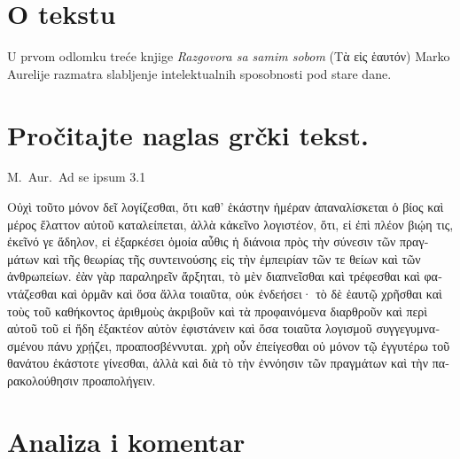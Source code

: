 \section*{O tekstu}

U prvom odlomku treće knjige \textit{Razgovora sa samim sobom} \textgreek[variant=ancient]{(Tὰ εἰς ἑαυτόν)} Marko Aurelije razmatra slabljenje intelektualnih sposobnosti pod stare dane.

\section*{Pročitajte naglas grčki tekst.}

M.~Aur.\ Ad se ipsum 3.1


\medskip


{\large

\begin{greek}

\noindent Οὐχὶ τοῦτο μόνον δεῖ λογίζεσθαι, ὅτι καθ' ἑκάστην ἡμέραν ἀπαναλίσκεται ὁ βίος καὶ μέρος ἔλαττον αὐτοῦ καταλείπεται, ἀλλὰ κἀκεῖνο λογιστέον, ὅτι, εἰ ἐπὶ πλέον βιῴη τις, ἐκεῖνό γε ἄδηλον, εἰ ἐξαρκέσει ὁμοία αὖθις ἡ διάνοια πρὸς τὴν σύνεσιν τῶν πραγμάτων καὶ τῆς θεωρίας τῆς συντεινούσης εἰς τὴν ἐμπειρίαν τῶν τε θείων καὶ τῶν ἀνθρωπείων. ἐὰν γὰρ παραληρεῖν ἄρξηται, τὸ μὲν διαπνεῖσθαι καὶ τρέφεσθαι καὶ φαντάζεσθαι καὶ ὁρμᾶν καὶ ὅσα ἄλλα τοιαῦτα, οὐκ ἐνδεήσει· τὸ δὲ ἑαυτῷ χρῆσθαι καὶ τοὺς τοῦ καθήκοντος ἀριθμοὺς ἀκριβοῦν καὶ τὰ προφαινόμενα διαρθροῦν καὶ περὶ αὐτοῦ τοῦ εἰ ἤδη ἐξακτέον αὑτὸν ἐφιστάνειν καὶ ὅσα τοιαῦτα λογισμοῦ συγγεγυμνασμένου πάνυ χρῄζει, προαποσβέννυται. χρὴ οὖν ἐπείγεσθαι οὐ μόνον τῷ ἐγγυτέρω τοῦ θανάτου ἑκάστοτε γίνεσθαι, ἀλλὰ καὶ διὰ τὸ τὴν ἐννόησιν τῶν πραγμάτων καὶ τὴν παρακολούθησιν προαπολήγειν.


\end{greek}


}



\section*{Analiza i komentar}


